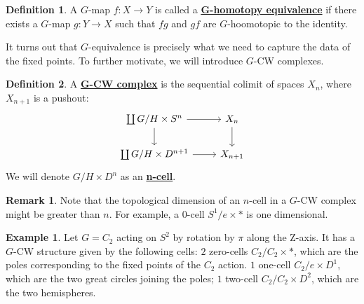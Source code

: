 \documentclass{article}
\theoremstyle{definition}
\theoremstyle{definition}
\newtheorem{definition}{Definition}[theorem]
\theoremstyle{definition}
\newtheorem{remark}{Remark}[theorem]
\theoremstyle{definition}
\theoremstyle{definition}
\theoremstyle{definition}
\theoremstyle{definition}
\newtheorem{example}{Example}[theorem]
\begin{document}
\begin{tcolorbox}[colback=purple!5!white,colframe=purple!75!black]
\begin{definition}
A $G$-map $f: X\to Y$ is called a \underline{\textbf{G-homotopy equivalence}} if there exists a $G$-map $g: Y\to X$ such that $fg$ and $gf$ are $G$-hoomotopic to the identity.
\end{definition}
\end{tcolorbox} 

It turns out that $G$-equivalence is precisely what we need to capture the data of the fixed points. To further motivate, we will introduce $G$-CW complexes. 


\begin{tcolorbox}[colback=purple!5!white,colframe=purple!75!black]
    \begin{definition}
    A \underline{\textbf{G-CW complex}} is the sequential colimit of spaces $X_n$, where $X_{n+1}$ is a pushout: 
    \[\begin{tikzcd}
    \coprod G/H\times S^n\arrow[r]\arrow[d]&X_n\arrow[d]\\
    \coprod G/H\times D^{n+1}\arrow[r]&X_{n+1}
    \end{tikzcd}\]
    We will denote  $G/H\times D^{n}$ as an \underline{\textbf{n-cell}}. 
    \end{definition}
    \end{tcolorbox}
    
    \begin{tcolorbox}[colback=green!5!white,colframe=green!30!white]
    \begin{remark}
    Note that the topological dimension of an $n$-cell in a $G$-CW complex might be greater than $n$. For example, a $0$-cell $S^1/e\times *$ is one dimensional. 
    \end{remark}
    \end{tcolorbox}
    
    \begin{tcolorbox}[colback=yellow!5!white,colframe=yellow!30!white]
    \begin{example}
    Let $G=C_2$ acting on $S^2$ by rotation by $\pi$ along the Z-axis. It has a $G$-CW structure given by the following cells: $2$ zero-cells $C_2/C_2\times *$, which are the poles corresponding to the fixed points of the $C_2$ action. $1$ one-cell $C_2/e\times D^1$, which are the two great circles joining the poles; $1$ two-cell $C_2/C_2\times D^2$, which are the two hemispheres.  
    \end{example}
    \end{tcolorbox}
    
\end{document}
